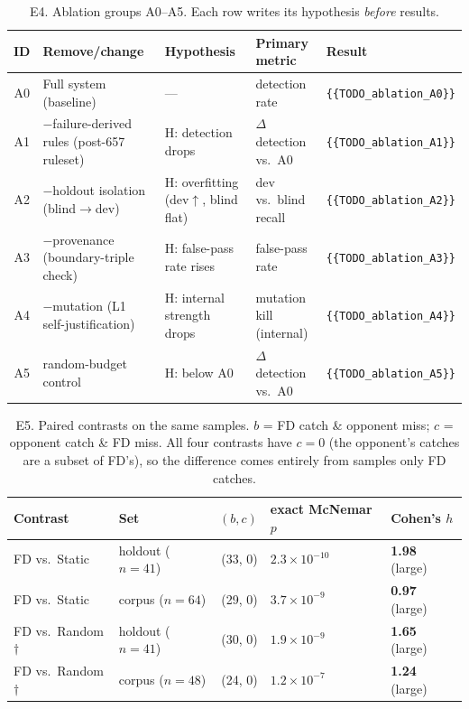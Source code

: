 \documentclass{article}
\begin{document}
\begin{table}[t]
\caption{E4. Ablation groups A0--A5. Each row writes its hypothesis \emph{before} results.}
\label{tab:e4}
\centering
\footnotesize
\begin{tabular}{@{}clp{3.3cm}p{3.6cm}l@{}}
\toprule
ID & Remove/change & Hypothesis & Primary metric & Result \\
\midrule
A0 & Full system (baseline) & --- & detection rate & \texttt{\{\{TODO\_ablation\_A0\}\}} \\
A1 & $-$failure-derived rules (post-657 ruleset) & H: detection drops & $\Delta$ detection vs.\ A0 & \texttt{\{\{TODO\_ablation\_A1\}\}} \\
A2 & $-$holdout isolation (blind$\to$dev) & H: overfitting (dev$\uparrow$, blind flat) & dev vs.\ blind recall & \texttt{\{\{TODO\_ablation\_A2\}\}} \\
A3 & $-$provenance (boundary-triple check) & H: false-pass rate rises & false-pass rate & \texttt{\{\{TODO\_ablation\_A3\}\}} \\
A4 & $-$mutation (L1 self-justification) & H: internal strength drops & mutation kill (internal) & \texttt{\{\{TODO\_ablation\_A4\}\}} \\
A5 & random-budget control & H: below A0 & $\Delta$ detection vs.\ A0 & \texttt{\{\{TODO\_ablation\_A5\}\}} \\
\bottomrule
\end{tabular}
\end{table}
\begin{table}[h]
\caption{E5. Paired contrasts on the same samples. $b$ = FD catch \& opponent miss;
$c$ = opponent catch \& FD miss. All four contrasts have $c=0$ (the opponent's catches are a
subset of FD's), so the difference comes entirely from samples only FD catches.}
\label{tab:e5}
\centering
\footnotesize
\begin{tabular}{@{}llrll@{}}
\toprule
Contrast & Set & $(b, c)$ & exact McNemar $p$ & Cohen's $h$ \\
\midrule
FD vs.\ Static & holdout ($n{=}41$) & (33, 0) & $2.3\times10^{-10}$ & \textbf{1.98} (large) \\
FD vs.\ Static & corpus ($n{=}64$) & (29, 0) & $3.7\times10^{-9}$ & \textbf{0.97} (large) \\
FD vs.\ Random$\dagger$ & holdout ($n{=}41$) & (30, 0) & $1.9\times10^{-9}$ & \textbf{1.65} (large) \\
FD vs.\ Random$\dagger$ & corpus ($n{=}48$) & (24, 0) & $1.2\times10^{-7}$ & \textbf{1.24} (large) \\
\bottomrule
\end{tabular}
\end{table}
\end{document}
